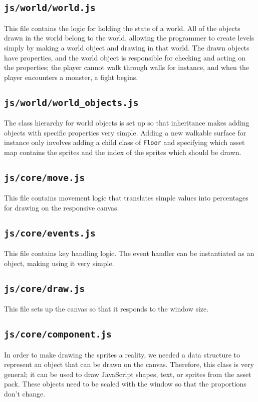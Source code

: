 \documentclass[11pt]{article}
\begin{document}
\subsection{\texttt{js/world/world.js}}
\label{sec:org45de465}
This file contains the logic for holding the state of a world. All of the objects drawn in the world belong to the world, allowing the programmer to create levels simply by making a world object and drawing in that world. The drawn objects have properties, and the world object is responsible for checking and acting on the properties; the player cannot walk through walls for instance, and when the player encounters a monster, a fight begins.\\
\subsection{\texttt{js/world/world\_objects.js}}
\label{sec:org44357f0}
The class hierarchy for world objects is set up so that inheritance makes adding objects with specific properties very simple. Adding a new walkable surface for instance only involves adding a child class of \texttt{Floor} and specifying which asset map contains the sprites and the index of the sprites which should be drawn.\\
\subsection{\texttt{js/core/move.js}}
\label{sec:orgdd9439d}
This file contains movement logic that translates simple values into percentages for drawing on the responsive canvas.\\
\subsection{\texttt{js/core/events.js}}
\label{sec:org3d61063}
This file contains key handling logic. The event handler can be instantiated as an object, making using it very simple.\\
\subsection{\texttt{js/core/draw.js}}
\label{sec:org9956f25}
This file sets up the canvas so that it responds to the window size.\\
\subsection{\texttt{js/core/component.js}}
\label{sec:org0b858c0}
In order to make drawing the sprites a reality, we needed a data structure to represent an object that can be drawn on the canvas. Therefore, this class is very general; it can be used to draw JavaScript shapes, text, or sprites from the asset pack. These objects need to be scaled with the window so that the proportions don't change.\\
\end{document}
